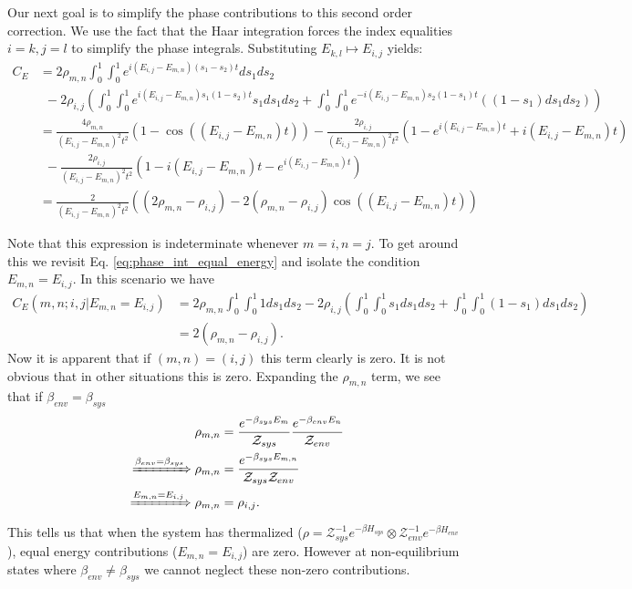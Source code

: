 \documentclass{article}
\newcommand{\parens}[1]{\left( #1 \right)}
\newcommand{\partfun}{\mathcal{Z}}
\begin{document}
Our next goal is to simplify the phase contributions to this second order correction. We use the fact that the Haar integration forces the index equalities $i = k, j = l$ to simplify the phase integrals. Substituting $E_{k,l} \mapsto E_{i,j}$ yields:
\begin{align}
    C_E &= 2 \rho_{m,n} \int_0^1 \int_0^1 e^{i(E_{i,j} - E_{m,n})(s_1 - s_2)t} ds_1 ds_2 \nonumber \\
    &~ ~ - 2 \rho_{i,j} \parens{\int_0^1 \int_0^1 e^{i (E_{i,j} - E_{m,n})s_1 (1- s_2)t}s_1 ds_1 ds_2 + \int_0^1 \int_0^1 e^{-i(E_{i,j} - E_{m,n})s_2(1-s_1)t}((1-s_1)ds_1 ds_2)} \label{eq:phase_int_equal_energy} \\
    &= \frac{4 \rho_{m,n}}{(E_{i,j} - E_{m,n})^2 t^2} (1 - \cos((E_{i,j} - E_{m,n})t)) - \frac{2 \rho_{i,j}}{(E_{i,j} - E_{m,n})^2 t^2} \parens{1 - e^{i (E_{i,j} - E_{m,n})t} + i (E_{i,j} - E_{m,n})t } \\
    & ~ ~ - \frac{2 \rho_{i,j}}{(E_{i,j} - E_{m,n})^2 t^2} \parens{1 - i (E_{i,j} - E_{m,n})t - e^{i(E_{i,j} - E_{m,n})t}} \\
    &= \frac{2}{(E_{i,j} - E_{m,n})^2 t^2} \parens{(2 \rho_{m,n} - \rho_{i,j}) - 2(\rho_{m,n} - \rho_{i,j}) \cos ((E_{i,j} - E_{m,n})t)}  
\end{align}

Note that this expression is indeterminate whenever $m = i, n = j$. To get around this we revisit Eq. \eqref{eq:phase_int_equal_energy} and isolate the condition $E_{m,n} = E_{i,j}$. In this scenario we have
\begin{align}
    C_E(m,n;i,j | E_{m,n} = E_{i,j}) &= 2 \rho_{m,n} \int_0^1 \int_0^1 1 ds_1 ds_2 - 2 \rho_{i,j} \parens{\int_0^1 \int_0^1 s_1 ds_1 ds_2 + \int_0^1 \int_0^1 (1-s_1) ds_1 ds_2} \\
    &= 2 (\rho_{m,n} - \rho_{i,j}).
\end{align}
Now it is apparent that if $(m,n) = (i,j)$ this term clearly is zero. It is not obvious that in other situations this is zero. Expanding the $\rho_{m,n}$ term, we see that if $\beta_{env} = \beta_{sys}$
\begin{align}
    \rho_{m,n} &= \frac{e^{-\beta_{sys} E_m}}{\partfun_{sys}} \frac{e^{-\beta_{env} E_{n}}}{\partfun_{env}} \\
    \xRightarrow{\beta_{env} = \beta_{sys}} \rho_{m,n} &= \frac{e^{-\beta_{sys}E_{m,n}}}{\partfun_{sys} \partfun_{env}} \\
    \xRightarrow{E_{m,n} = E_{i,j}} \rho_{m,n} &= \rho_{i,j}.
\end{align}
This tells us that when the system has thermalized ($\rho = \partfun_{sys}^{-1} e^{-\beta H_{sys}} \otimes \partfun_{env}^{-1} e^{-\beta H_{env}}$), equal energy contributions ($E_{m,n} = E_{i,j}$) are zero. However at non-equilibrium states where $\beta_{env} \neq \beta_{sys}$ we cannot neglect these non-zero contributions. 
\end{document}
